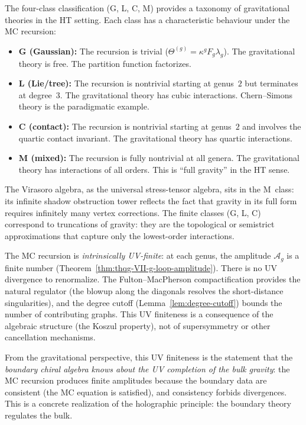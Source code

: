 \begin{remark}
\label{rem:thqg-VII-landscape}
The four-class classification (G, L, C, M) provides a taxonomy
of gravitational theories in the HT setting. Each class has a
characteristic behaviour under the MC recursion:
\begin{itemize}
\item \textbf{G (Gaussian):} The recursion is trivial
 ($\Theta^{(g)} = \kappa^g F_g \lambda_g$). The gravitational
 theory is free. The partition function factorizes.
\item \textbf{L (Lie/tree):} The recursion is nontrivial
 starting at genus~$2$ but terminates at degree~$3$. The
 gravitational theory has cubic interactions. Chern--Simons
 theory is the paradigmatic example.
\item \textbf{C (contact):} The recursion is nontrivial
 starting at genus~$2$ and involves the quartic contact
 invariant. The gravitational theory has quartic interactions.
\item \textbf{M (mixed):} The recursion is fully nontrivial
 at all genera. The gravitational theory has interactions of
 all orders. This is ``full gravity'' in the HT sense.
\end{itemize}
The Virasoro algebra, as the universal stress-tensor algebra,
sits in the M~class: its infinite shadow obstruction tower reflects the
fact that gravity in its full form requires infinitely many
vertex corrections. The finite classes (G, L, C) correspond
to truncations of gravity: they are the topological or
semistrict approximations that capture only the lowest-order
interactions.
\end{remark}

\begin{remark}
\label{rem:thqg-VII-uv-finiteness}
The MC recursion is \emph{intrinsically UV-finite}: at each
genus, the amplitude $\mathcal{A}_g$ is a finite number
(Theorem~\ref{thm:thqg-VII-g-loop-amplitude}). There is no
UV divergence to renormalize. The Fulton--MacPherson
compactification provides the natural regulator (the
blowup along the diagonals resolves the short-distance
singularities), and the degree cutoff
(Lemma~\ref{lem:degree-cutoff}) bounds the number of
contributing graphs. This UV finiteness is a consequence
of the algebraic structure (the Koszul property), not of
supersymmetry or other cancellation mechanisms.

From the gravitational perspective, this UV finiteness is the
statement that the \emph{boundary chiral algebra knows about
the UV completion of the bulk gravity}: the MC recursion
produces finite amplitudes because the boundary data are
consistent (the MC equation is satisfied), and consistency
forbids divergences. This is a concrete realization of the
holographic principle: the boundary theory regulates the bulk.
\end{remark}
